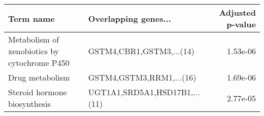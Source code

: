 \begin{tabular}{llr}
\toprule
                                   Term name &          Overlapping genes... &  Adjusted p-value \\
\midrule
Metabolism of xenobiotics by cytochrome P450 &      GSTM4,CBR1,GSTM3,...(14) &          1.53e-06 \\
                             Drug metabolism &      GSTM4,GSTM3,RRM1,...(16) &          1.69e-06 \\
                Steroid hormone biosynthesis & UGT1A1,SRD5A1,HSD17B1,...(11) &          2.77e-05 \\
\bottomrule
\end{tabular}
